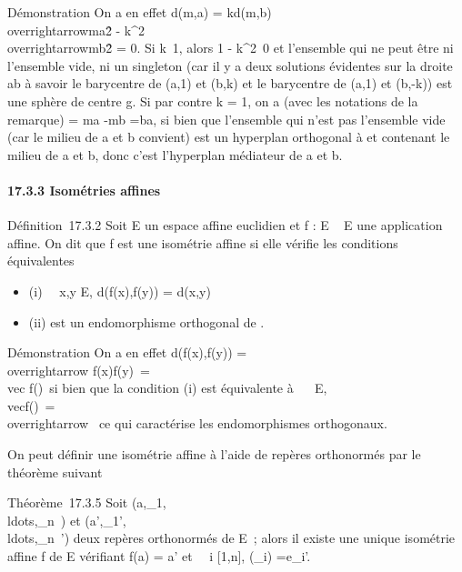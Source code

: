 \documentclass[]{article}
\begin{document}
Démonstration On a en effet d(m,a) = kd(m,b)
\Leftrightarrow
\\overrightarrowma\^2
-
k^2\\overrightarrowmb\^2
= 0. Si k\neq~1, alors 1 -
k^2\neq~0 et l'ensemble qui ne peut
être ni l'ensemble vide, ni un singleton (car il y a deux solutions
évidentes sur la droite ab à savoir le barycentre de (a,1) et (b,k) et
le barycentre de (a,1) et (b,-k)) est une sphère de centre g. Si par
contre k = 1, on a (avec les notations de la remarque)
\overrightarrowu =\overrightarrow
ma -\overrightarrow mb
=\overrightarrow ba, si bien que l'ensemble qui n'est
pas l'ensemble vide (car le milieu de a et b convient) est un hyperplan
orthogonal à \overrightarrowba et contenant le milieu
de a et b, donc c'est l'hyperplan médiateur de a et b.

\paragraph{17.3.3 Isométries affines}

Définition~17.3.2 Soit E un espace affine euclidien et f : E \rightarrow~ E une
application affine. On dit que f est une isométrie affine si elle
vérifie les conditions équivalentes

\begin{itemize}
\itemsep1pt\parskip0pt
\item
  (i) \forall~~x,y \in E, d(f(x),f(y)) = d(x,y)
\item
  (ii) \vecf est un endomorphisme orthogonal de
  \overrightarrowE.
\end{itemize}

Démonstration On a en effet d(f(x),f(y))
=\\overrightarrow
f(x)f(y)\
=\\vec
f(\overrightarrowxy)\ si
bien que la condition (i) est équivalente à
\forall~\overrightarrow\xi~
\in\overrightarrow E,
\\vecf(\overrightarrow\xi)\
=\\overrightarrow
\xi\ ce qui caractérise les endomorphismes
orthogonaux.

On peut définir une isométrie affine à l'aide de repères orthonormés par
le théorème suivant

Théorème~17.3.5 Soit
(a,\vece_1,\\ldots,\vece_n~)
et
(a',\vece_1',\\ldots,\vece_n~')
deux repères orthonormés de E~; alors il existe une unique isométrie
affine f de E vérifiant f(a) = a' et \forall~~i \in
{[}1,n{]}, \vecf(\vece_i)
=\vec e_i'.
\end{document}
